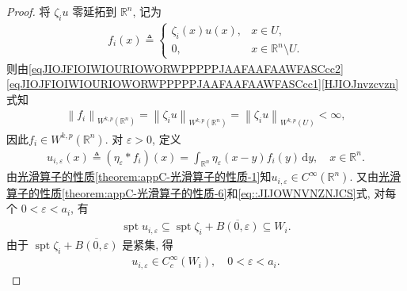 \documentclass[../../main.tex]{subfiles}
\begin{document}
\begin{proof}
将 $\zeta_i u$ 零延拓到 $\mathbb{R}^n$, 记为
\begin{align*}
f_i(x)\triangleq
\begin{cases}
\zeta_i(x)u(x),&x\in U,\\
0,&x\in\mathbb{R}^n\setminus U.
\end{cases}
\end{align*}
则由\eqref{eqJIOJFIOIWIOURIOWORWPPPPPJAAFAAFAAWFASCcc2}\eqref{eqJIOJFIOIWIOURIOWORWPPPPPJAAFAAFAAWFASCcc1}\eqref{HJIOJnvzcvzn}式知
\begin{align*}
\left\| f_i \right\| _{W^{k,p}\left( \mathbb{R} ^n \right)}=\left\| \zeta _iu \right\| _{W^{k,p}\left( \mathbb{R} ^n \right)}=\left\| \zeta _iu \right\| _{W^{k,p}\left( U \right)}<\infty ,
\end{align*}
因此$f_i\in W^{k,p}(\mathbb{R}^n)$.
对 $\varepsilon>0$, 定义
\begin{align*}
u_{i,\varepsilon}(x)
\triangleq(\eta_\varepsilon*f_i)(x)
=\int_{\mathbb{R}^n}
\eta_\varepsilon(x-y)f_i(y)\,\mathrm{d}y,
\quad x\in\mathbb{R}^n.
\end{align*}
由\hyperref[theorem:appC-光滑算子的性质-1]{光滑算子的性质\ref{theorem:appC-光滑算子的性质-1}}知$u_{i,\varepsilon}\in C^\infty(\mathbb{R}^n)$.
又由\hyperref[theorem:appC-光滑算子的性质-6]{光滑算子的性质\ref{theorem:appC-光滑算子的性质-6}}和\eqref{eq::JIJOWNVNZNJCS}式, 对每个 $0<\varepsilon<a_i$, 有
\begin{align}
\operatorname{spt}u_{i,\varepsilon}
\subseteq \operatorname{spt}\zeta_i+\overline{B(0,\varepsilon)}
\subseteq W_i.
\label{eq::jiowjioWJioFJIOUWE-12132}
\end{align}
由于 $\operatorname{spt}\zeta_i+\overline{B(0,\varepsilon)}$ 是紧集, 得
\begin{align}\label{eqHuEhiojwije}
u_{i,\varepsilon}\in C_c^\infty(W_i),
\quad 0<\varepsilon<a_i.
\end{align}


\end{proof}
\end{document}
